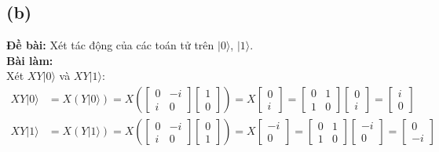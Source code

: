 \subsection{(b)}
\textbf{Đề bài:} Xét tác động của các toán tử trên $|0\rangle$, $|1\rangle$.\\
\textbf{Bài làm:}\\
Xét $XY|0\rangle$ và $XY|1\rangle$:
\begin{align*}
    XY|0\rangle &= X(Y|0\rangle) = X\left(\begin{bmatrix}
        0 & -i\\
        i & 0
    \end{bmatrix}
    \begin{bmatrix}
        1\\
        0
    \end{bmatrix}\right)
    = X\begin{bmatrix}
        0\\
        i
    \end{bmatrix}
    = \begin{bmatrix}
        0 & 1\\
        1 & 0
    \end{bmatrix}
    \begin{bmatrix}
        0\\
        i
    \end{bmatrix}
    = \begin{bmatrix}
        i\\
        0
    \end{bmatrix}\\
    XY|1\rangle &= X(Y|1\rangle) = X\left(\begin{bmatrix}
        0 & -i\\
        i & 0
    \end{bmatrix}
    \begin{bmatrix}
        0\\
        1
    \end{bmatrix}\right)
    = X\begin{bmatrix}
        -i\\
        0
    \end{bmatrix}
    = \begin{bmatrix}
        0 & 1\\
        1 & 0
    \end{bmatrix}
    \begin{bmatrix}
        -i\\
        0
    \end{bmatrix}
    = \begin{bmatrix}
        0\\
        -i
    \end{bmatrix}
\end{align*}
